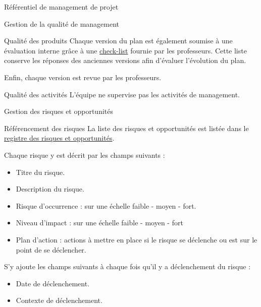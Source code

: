 \documentclass[]{article}
\begin{document}
{\begin{section}{\label{sec:Référentiel de management de projet}Référentiel de management de projet}
\begin{subsection}{\label{sec:Gestion de la qualité de management}Gestion de la qualité de management}
\begin{subsubsection}{\label{sec:Qualité des produits}Qualité des produits}
             Chaque version du plan est également soumise à une évaluation interne grâce à une \href{Check_list.ods}{check-list} fournie par les professeurs. Cette liste conserve les réponses des anciennes versions afin d’évaluer l’évolution du plan.

             Enfin, chaque version est revue par les professeurs.
         \end{subsubsection}

         \begin{subsubsection}{\label{sec:Qualité des activités}Qualité des activités}
             L’équipe ne supervise pas les activités de management.
         \end{subsubsection}
     \end{subsection}

     \begin{subsection}{\label{sec:Gestion des risques et opportunités}Gestion des risques et opportunités}
         \begin{subsubsection}{\label{sec:Référencement des risques}Référencement des risques}
             La liste des risques et opportunités est listée dans le \href{documents/Registre_des_risques.pdf}{registre des risques et opportunités}.

             Chaque risque y est décrit par les champs suivants :
             \begin{itemize}
                 \item Titre du risque.
                 \item Description du risque.
                 \item Risque d’occurrence : sur une échelle faible - moyen - fort.
                 \item Niveau d'impact : sur une échelle faible - moyen - fort
                 \item Plan d'action : actions à mettre en place si le risque se déclenche ou est sur le point de se déclencher.
             \end{itemize}

             S'y ajoute les champs suivants à chaque fois qu'il y a déclenchement du risque :
             \begin{itemize}
                 \item Date de déclenchement.
                 \item Contexte de déclenchement.
             \end{itemize}
         \end{subsubsection}


\end{subsection}
\end{section}}
\end{document}

